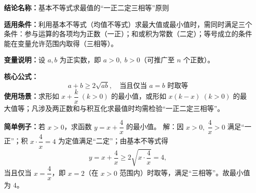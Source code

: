 \textbf{结论名称：}基本不等式求最值的“一正二定三相等”原则

\textbf{适用条件：}利用基本不等式（均值不等式）求最大值或最小值时，需同时满足三个条件：参与运算的各项均为正数（一正）；和或积为常数（二定）；等号成立的条件能在变量允许范围内取得（三相等）。

\textbf{变量说明：}设 $a,b$ 为正实数，即 $a>0,\; b>0$（可推广至 $n$ 个正数）。

\textbf{核心公式：}
\[
\boxed{a+b \ge 2\sqrt{ab},\quad \text{当且仅当 } a=b \text{ 时取等}}
\]
\textbf{使用场景：}求形如 $x+\dfrac{k}{x}\;(k>0)$ 的最小值，或形如 $x(k-x)\;(k>0)$ 的最大值等；凡涉及两正数和与积互化求最值时均需检验“一正二定三相等”。

\textbf{简单例子：}若 $x>0$，求函数 $y=x+\dfrac{4}{x}$ 的最小值。
解：因 $x>0,\;\dfrac{4}{x}>0$ 满足“一正”；积 $x\cdot\dfrac{4}{x}=4$ 为定值满足“二定”；由基本不等式得
\[
y = x+\frac{4}{x} \ge 2\sqrt{x\cdot\frac{4}{x}}=4,
\]
当且仅当 $x=\dfrac{4}{x}$，即 $x=2$（在 $x>0$ 范围内）时取等，满足“三相等”。故最小值为 $4$。